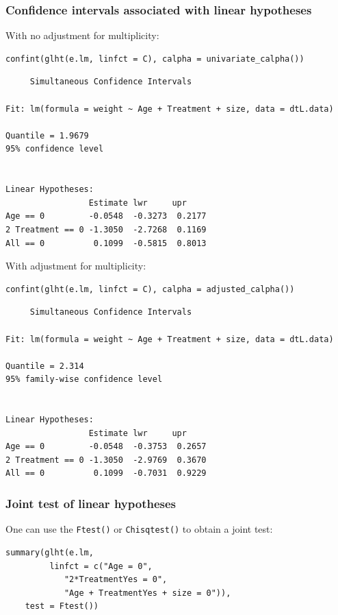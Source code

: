 \documentclass{article}
\begin{document}
\subsubsection{Confidence intervals associated with linear hypotheses}
\label{sec:org446ba81}

With no adjustment for multiplicity:
\lstset{language=r,label= ,caption= ,captionpos=b,numbers=none}
\begin{lstlisting}
confint(glht(e.lm, linfct = C), calpha = univariate_calpha())
\end{lstlisting}

\begin{verbatim}
	 Simultaneous Confidence Intervals

Fit: lm(formula = weight ~ Age + Treatment + size, data = dtL.data)

Quantile = 1.9679
95% confidence level
 

Linear Hypotheses:
                 Estimate lwr     upr    
Age == 0         -0.0548  -0.3273  0.2177
2 Treatment == 0 -1.3050  -2.7268  0.1169
All == 0          0.1099  -0.5815  0.8013
\end{verbatim}

With adjustment for multiplicity:
\lstset{language=r,label= ,caption= ,captionpos=b,numbers=none}
\begin{lstlisting}
confint(glht(e.lm, linfct = C), calpha = adjusted_calpha())
\end{lstlisting}

\begin{verbatim}
	 Simultaneous Confidence Intervals

Fit: lm(formula = weight ~ Age + Treatment + size, data = dtL.data)

Quantile = 2.314
95% family-wise confidence level
 

Linear Hypotheses:
                 Estimate lwr     upr    
Age == 0         -0.0548  -0.3753  0.2657
2 Treatment == 0 -1.3050  -2.9769  0.3670
All == 0          0.1099  -0.7031  0.9229
\end{verbatim}

\subsubsection{Joint test of linear hypotheses}
\label{sec:orgf5ddcde}

One can use the \texttt{Ftest()} or \texttt{Chisqtest()} to obtain a joint test:
\lstset{language=r,label= ,caption= ,captionpos=b,numbers=none}
\begin{lstlisting}
summary(glht(e.lm, 
	     linfct = c("Age = 0",
			"2*TreatmentYes = 0",
			"Age + TreatmentYes + size = 0")), 
	test = Ftest())
\end{lstlisting}
\end{document}
